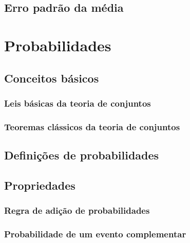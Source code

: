 \documentclass[
]{book}
\begin{document}
\hypertarget{erro-padruxe3o-da-muxe9dia}{%
\section{Erro padrão da média}\label{erro-padruxe3o-da-muxe9dia}}

\hypertarget{chap:cap5}{%
\chapter{Probabilidades}\label{chap:cap5}}

\hypertarget{conceitos-buxe1sicos}{%
\section{Conceitos básicos}\label{conceitos-buxe1sicos}}

\hypertarget{leis-buxe1sicas-da-teoria-de-conjuntos}{%
\subsection{Leis básicas da teoria de conjuntos}\label{leis-buxe1sicas-da-teoria-de-conjuntos}}

\hypertarget{teoremas-cluxe1ssicos-da-teoria-de-conjuntos}{%
\subsection{Teoremas clássicos da teoria de conjuntos}\label{teoremas-cluxe1ssicos-da-teoria-de-conjuntos}}

\hypertarget{definiuxe7uxf5es-de-probabilidades}{%
\section{Definições de probabilidades}\label{definiuxe7uxf5es-de-probabilidades}}

\hypertarget{propriedades}{%
\section{Propriedades}\label{propriedades}}

\hypertarget{regra-de-adiuxe7uxe3o-de-probabilidades}{%
\subsection{Regra de adição de probabilidades}\label{regra-de-adiuxe7uxe3o-de-probabilidades}}

\hypertarget{probabilidade-de-um-evento-complementar}{%
\subsection{Probabilidade de um evento complementar}\label{probabilidade-de-um-evento-complementar}}
\end{document}
